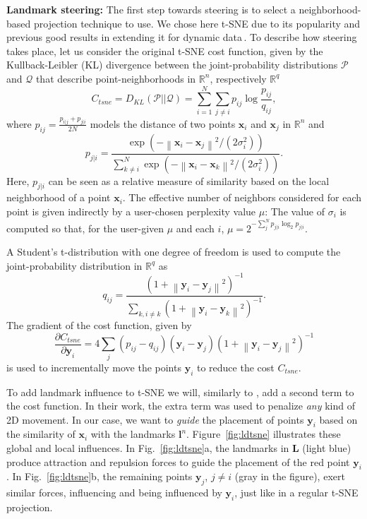 \vspace{-0.15cm}
\noindent\textbf{Landmark steering:} The first step towards steering is to select a neighborhood-based projection technique to use. We chose here t-SNE due to its popularity and previous good results in extending it for dynamic data\,\citep{Rauber2016}. To describe how steering takes place, let us consider the original t-SNE cost function, given by the Kullback-Leibler (KL) divergence between the joint-probability distributions $\mathcal P$ and $\mathcal Q$ that describe point-neighborhoods in $\mathbb{R}^n$, respectively $\mathbb{R}^q$
%
\begin{equation}
C_{tsne} = D_{KL}\left(\mathcal{P}||\mathcal{Q}\right) =  \sum_{i=1}^{N} \sum_{j\neq i} p_{i j} \log \frac{p_{i j}}{q_{i j}},
\label{eqn:c_tsne}
\end{equation}
%
where $ p_{ij}=\frac{p_{i | j}+p_{j | i}}{2 N}$ models the distance of two points $\mathbf{x}_i$ and $\mathbf{x}_j$ in $\mathbb{R}^n$ and
%
$$ p_{j | i}=\frac{\exp \left(-\left\|\mathbf{x}_{i}-\mathbf{x}_{j}\right\|^{2} / \left(2 \sigma_{i}^{2}\right)\right)}  
{\sum_{k \neq i}^{N} \exp \left(-\left\|\mathbf{x}_{i}-\mathbf{x}_{k}\right\|^{2} /\left(2 \sigma_{i}^{2}\right)\right)}. $$
%
Here, $p_{j|i}$ can be seen as a relative measure of similarity based on the local neighborhood of a point $\mathbf{x}_i$. The effective number of neighbors considered for each point is given indirectly by a user-chosen perplexity value $\mu$: The value of $\sigma_i$ is computed so that, for the user-given $\mu$ and each $i$, $\mu=2^{-\sum_{j}^{N} p_{j | i} \log _{2} p_{j | i}}$.

A Student's t-distribution with one degree of freedom is used to compute the joint-probability distribution in $\mathbb{R}^q$ as
%
$$q_{i j}=\frac{\left(1+\left\|\mathbf{y}_{i}-\mathbf{y}_{j}\right\|^{2}\right)^{-1}}{\sum_{k, i \neq k}\left(1+\left\|\mathbf{y}_{i}-\mathbf{y}_{k}\right\|^{2}\right)^{-1}}.
$$
The gradient of the cost function, given by
%
\begin{equation}
 \frac{\partial C_{tsne}}{\partial \mathbf{y}_{i}}=4 \sum_{j}\left(p_{i j}-q_{i j}\right)\left(\mathbf{y}_{i}-\mathbf{y}_{j}\right)\left(1+\left\|\mathbf{y}_{i}-\mathbf{y}_{j}\right\|^{2}\right)^{-1} 
 \label{eqn:grad_tsne}
\end{equation}
%
is used to incrementally move the points $\mathbf{y}_i$ to reduce the cost $C_{tsne}$.

To add landmark influence to t-SNE we will, similarly to \cite{Rauber2016}, add a second term to the cost function. In their work, the extra term was used to penalize \emph{any} kind of 2D movement. In our case, we want to \emph{guide} the placement of points $\mathbf{y}_i$ based on the similarity of $\mathbf{x}_i$ with the landmarks $\mathbf{l}^n$. Figure~\ref{fig:ldtsne} illustrates these global and local influences. In Fig.~\ref{fig:ldtsne}a, the landmarks in $\mathbf{L}$ (light blue) produce attraction and repulsion forces to guide the placement of the red point $\mathbf{y}_i$. In Fig.~\ref{fig:ldtsne}b, the remaining points $\mathbf{y}_j$, $j \neq i$ (gray in the figure), exert similar forces, influencing and being influenced by $\mathbf{y}_i$, just like in a regular t-SNE projection.

